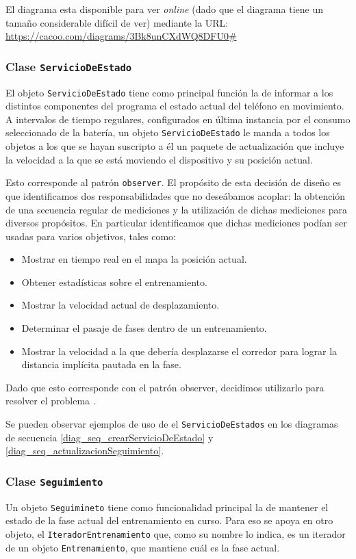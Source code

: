 \documentclass[10pt, a4paper,english,spanish]{article}
\begin{document}
El diagrama esta disponible para ver \textit{online} (dado que el diagrama tiene un tamaño considerable difícil de ver) mediante la URL: \url{https://cacoo.com/diagrams/3Bk8unCXdWQ8DFU0#}

\subsubsection{Clase \texttt{ServicioDeEstado}}
El objeto \texttt{ServicioDeEstado} tiene como principal función la de informar a los distintos componentes del programa el estado actual del teléfono en movimiento. A intervalos de tiempo regulares, configurados en última instancia por el consumo seleccionado de la batería, un objeto \texttt{ServicioDeEstado} le manda a todos los objetos a los que se hayan suscripto a él un paquete de actualización que incluye la velocidad a la que se está moviendo el dispositivo y su posición actual.

Esto corresponde al patrón \texttt{observer}. El propósito de esta decisión de diseño es que identificamos dos responsabilidades que no deseábamos acoplar: la obtención de una secuencia regular de mediciones y la utilización de dichas mediciones para diversos propósitos. En particular identificamos que dichas mediciones podían ser usadas para varios objetivos, tales como:
\begin{itemize}
	\item Mostrar en tiempo real en el mapa la posición actual.
	\item Obtener estadísticas sobre el entrenamiento.
	\item Mostrar la velocidad actual de desplazamiento.
	\item Determinar el pasaje de fases dentro de un entrenamiento.
	\item Mostrar la velocidad a la que debería desplazarse el corredor para lograr la distancia implícita pautada en la fase.
\end{itemize}
Dado que esto corresponde con el patrón observer, decidimos utilizarlo para resolver el problema \cite{Gamma}.

Se pueden observar ejemplos de uso de el \texttt{ServicioDeEstados} en los diagramas de secuencia \ref{diag_seq_crearServicioDeEstado} y \ref{diag_seq_actualizacionSeguimiento}. 

\subsubsection{Clase \texttt{Seguimiento}}
Un objeto \texttt{Seguimineto} tiene como funcionalidad principal la de mantener el estado de la fase actual del entrenamiento en curso. Para eso se apoya en otro objeto, el \texttt{IteradorEntrenamiento} que, como su nombre lo indica, es un iterador de un objeto \texttt{Entrenamiento}, que mantiene cuál es la fase actual. 
\end{document}
